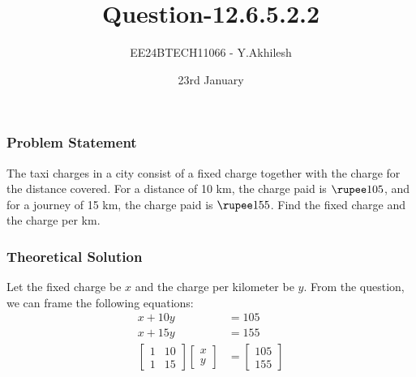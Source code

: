 \documentclass{beamer}
\begin{document}
\title{Question-12.6.5.2.2}
\author{EE24BTECH11066 - Y.Akhilesh}
\date{23rd January}
\frame{\titlepage}

\begin{frame}
\frametitle{Problem Statement}
The taxi charges in a city consist of a fixed charge together with the charge for the distance covered. For a distance of 10 km, the charge paid is \( \text{\rupee} 105 \), and for a journey of 15 km, the charge paid is \( \text{\rupee} 155 \). Find the fixed charge and the charge per km. \\
\end{frame}

\begin{frame}
\frametitle{Theoretical Solution}
Let the fixed charge be \( x \) and the charge per kilometer be \( y \). From the question, we can frame the following equations:\newline
\begin{align}
    x + 10y &= 105 \\
    x + 15y &= 155 \\
    \begin{bmatrix}1 & 10\\1 & 15\end{bmatrix}\begin{bmatrix}x\\y\end{bmatrix} &= \begin{bmatrix}105\\155\end{bmatrix}
\end{align}
\end{frame}
\end{document}
